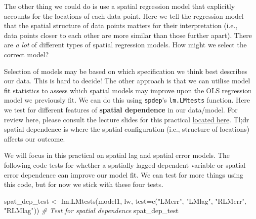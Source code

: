 \documentclass[
]{book}
\newenvironment{Shaded}{\begin{snugshade}}{\end{snugshade}}
\newcommand{\AttributeTok}[1]{\textcolor[rgb]{0.77,0.63,0.00}{#1}}
\newcommand{\CommentTok}[1]{\textcolor[rgb]{0.56,0.35,0.01}{\textit{#1}}}
\newcommand{\FunctionTok}[1]{\textcolor[rgb]{0.00,0.00,0.00}{#1}}
\newcommand{\NormalTok}[1]{#1}
\newcommand{\OtherTok}[1]{\textcolor[rgb]{0.56,0.35,0.01}{#1}}
\newcommand{\StringTok}[1]{\textcolor[rgb]{0.31,0.60,0.02}{#1}}
\begin{document}
The other thing we could do is use a spatial regression model that explicitly accounts for the locations of each data point. Here we tell the regression model that the spatial structure of data points matters for their interpretation (i.e., data points closer to each other are more similar than those further apart). There are \emph{a lot} of different types of spatial regression models. How might we select the correct model?

Selection of models may be based on which specification we think best describes our data. This is hard to decide! The other approach is that we can utilise model fit statistics to assess which spatial models may improve upon the OLS regression model we previously fit. We can do this using \texttt{spdep}'s \texttt{lm.LMtests} function. Here we test for different features of \textbf{spatial dependence} in our data/model. For review here, please consult the lecture slides for this practical \href{}{located here}. Tl;dr spatial dependence is where the spatial configuration (i.e., structure of locations) affects our outcome.

We will focus in this practical on spatial lag and spatial error models. The following code tests for whether a spatially lagged dependent variable or spatial error dependence can improve our model fit. We can test for more things using this code, but for now we stick with these four tests.

\begin{Shaded}
\begin{Highlighting}[]
\NormalTok{spat\_dep\_test }\OtherTok{\textless{}{-}} \FunctionTok{lm.LMtests}\NormalTok{(model1, lw, }\AttributeTok{test=}\FunctionTok{c}\NormalTok{(}\StringTok{"LMerr"}\NormalTok{, }\StringTok{"LMlag"}\NormalTok{, }\StringTok{"RLMerr"}\NormalTok{, }\StringTok{"RLMlag"}\NormalTok{)) }\CommentTok{\# Test for spatial dependence}
\NormalTok{spat\_dep\_test}
\end{Highlighting}
\end{Shaded}
\end{document}
